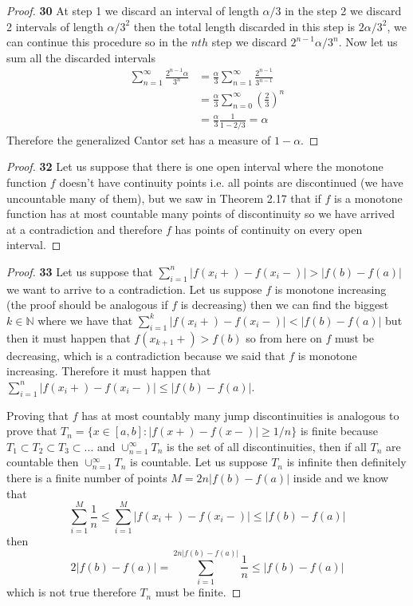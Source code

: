 \documentclass[11pt]{article}
\newcommand{\N}{\mathbb{N}}
\theoremstyle{definition}
\begin{document}
	\begin{proof}{\textbf{30}}
        At step 1 we discard an interval of length $\alpha / 3$ in the step 2 we discard
        2 intervals of length $\alpha / 3^{2}$ then the total length discarded in this
        step is $2\alpha/3^{2}$, we can continue this procedure so in the $nth$ step we 
        discard $2^{n-1}\alpha / 3^{n}$. Now let us sum all the discarded intervals
        \begin{align*}
            \sum_{n=1}^\infty \frac{2^{n-1}\alpha}{3^{n}} &= \frac{\alpha}{3}\sum_{n=1}^\infty \frac{2^{n-1}}{3^{n-1}}\\
                &= \frac{\alpha}{3}\sum_{n=0}^\infty \left(\frac{2}{3}\right)^n\\
                &= \frac{\alpha}{3}\frac{1}{1-2/3} = \alpha
        \end{align*}
        Therefore the generalized Cantor set has a measure of $1-\alpha$.
    \end{proof}
	\begin{proof}{\textbf{32}}
        Let us suppose that there is one open interval where the monotone function $f$
        doesn't have continuity points i.e. all points are discontinued (we have
        uncountable many of them), but we saw in Theorem 2.17 that if $f$ is a monotone
        function has at most countable many points of discontinuity so we have arrived
        at a contradiction and therefore $f$ has points of continuity on every open
        interval.
    \end{proof}
\cleardoublepage
	\begin{proof}{\textbf{33}}
        Let us suppose that $\sum_{i=1}^n |f(x_i +)- f(x_i-)| > |f(b) - f(a)|$ we want
        to arrive to a contradiction. Let us suppose $f$ is monotone increasing (the
        proof should be analogous if $f$ is decreasing) then we can find the biggest
        $k \in \N$ where we have that  $\sum_{i=1}^k |f(x_i +)- f(x_i-)| < |f(b) - f(a)|$
        but then it must happen that $f(x_{k+1}+) > f(b)$ so from here on $f$ must be decreasing, which is a
        contradiction because we said that $f$ is monotone increasing. Therefore it
        must happen that $\sum_{i=1}^n |f(x_i +)- f(x_i-)| \leq |f(b) - f(a)|$.

        Proving that $f$ has at most countably many jump discontinuities is analogous
        to prove that $T_n = \{x \in [a,b]:|f(x+)-f(x-)|\geq 1/n\}$ is finite
        because $T_1 \subset T_2 \subset T_3 \subset...$ and $\cup_{n=1}^\infty T_n$
        is the set of all discontinuities, then if all $T_n$ are countable then
        $\cup_{n=1}^\infty T_n$ is countable.
        Let us suppose $T_n$ is infinite then definitely there is a finite number of
        points $M = 2n|f(b)-f(a)|$ inside and we know that
        $$\sum_{i=1}^M \frac{1}{n} \leq \sum_{i=1}^M |f(x_i +)- f(x_i-)| \leq |f(b) - f(a)|$$
        then
        $$2|f(b) - f(a)| = \sum_{i=1}^{2n|f(b)-f(a)|} \frac{1}{n} \leq |f(b) - f(a)|$$
        which is not true therefore $T_n$ must be finite.
    \end{proof}
\end{document}
